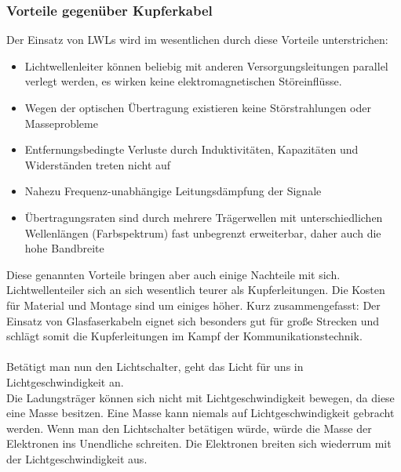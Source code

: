 \documentclass[11pt, a4paper]{article}
\begin{document}
\subsubsection{Vorteile gegenüber Kupferkabel}
Der Einsatz von LWLs wird im wesentlichen durch diese Vorteile unterstrichen:
\begin{itemize}
\item Lichtwellenleiter können beliebig mit anderen Versorgungsleitungen parallel verlegt werden, es
wirken keine elektromagnetischen Störeinflüsse.
\item Wegen der optischen Übertragung existieren keine Störstrahlungen oder Masseprobleme
\item Entfernungsbedingte Verluste durch Induktivitäten, Kapazitäten und Widerständen treten nicht
auf
\item Nahezu Frequenz-unabhängige Leitungsdämpfung der Signale
\item Übertragungsraten sind durch mehrere Trägerwellen mit unterschiedlichen Wellenlängen
(Farbspektrum) fast unbegrenzt erweiterbar, daher auch die hohe Bandbreite
\end{itemize}
Diese genannten Vorteile bringen aber auch einige Nachteile mit sich. Lichtwellenteiler sich an sich wesentlich teurer als Kupferleitungen. Die Kosten für Material und Montage sind um einiges höher. Kurz zusammengefasst: Der Einsatz von Glasfaserkabeln eignet sich besonders gut für große Strecken und schlägt somit die Kupferleitungen im Kampf der Kommunikationstechnik. \\ \\
Betätigt man nun den Lichtschalter, geht das Licht für uns in Lichtgeschwindigkeit an. \\
Die Ladungsträger können sich nicht mit Lichtgeschwindigkeit bewegen, da diese eine Masse besitzen. Eine Masse kann niemals auf Lichtgeschwindigkeit gebracht werden. Wenn man den Lichtschalter betätigen würde, würde die Masse der Elektronen ins Unendliche schreiten. Die Elektronen breiten sich wiederrum mit der Lichtgeschwindigkeit aus.
\newpage
\nocite{*}

{}
\end{document}
